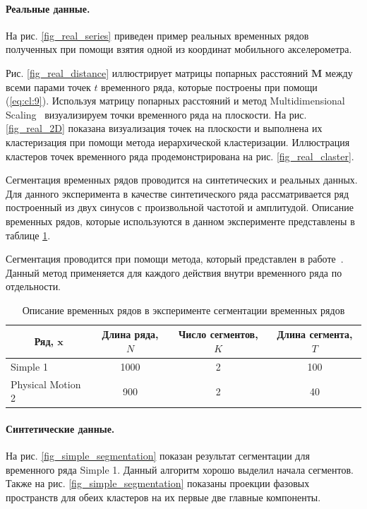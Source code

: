 \paragraph{Реальные данные.}

На рис. \ref{fig_real_series} приведен пример реальных временных рядов полученных при помощи взятия одной из координат мобильного акселерометра. 

Рис. \ref{fig_real_distance} иллюстрирует матрицы попарных расстояний $\textbf{M}$ между всеми парами точек $t$ временного ряда, которые построены при помощи (\ref{eq:cl:9}). 
Используя матрицу попарных расстояний и метод Multidimensional Scaling~\cite{Borg2005} визуализируем точки временного ряда на плоскости. 
На рис. \ref{fig_real_2D} показана визуализация точек на плоскости и выполнена их кластеризация при помощи метода иерархической кластеризации. 
Иллюстрация кластеров точек временного ряда продемонстрирована на рис. \ref{fig_real_claster}.

Сегментация временных рядов проводится на синтетических и реальных данных. Для данного эксперимента в качестве синтетического ряда рассматривается ряд построенный из двух синусов с произвольной частотой и амплитудой. Описание временных рядов, которые используются в данном эксперименте представлены в таблице \ref{table:3}.

Сегментация проводится при помощи метода, который представлен в работе~\cite{motrenko2015}. Данный метод применяется для каждого действия внутри временного ряда по отдельности.


\begin{table}[h!t]
\begin{center}
\caption{Описание временных рядов в эксперименте сегментации временных рядов}
\label{table:3}
\begin{tabular}{|c|c|c|c|}
\hline
	Ряд, $\textbf{x}$ &Длина ряда, $N$& Число сегментов, $K$&Длина сегмента, $T$\\
	\hline
	\multicolumn{1}{|l|}{Simple 1}
	& 1000& 2& 100\\
	\hline
	\multicolumn{1}{|l|}{Physical Motion 2}
	& 900& 2& 40\\
\hline

\end{tabular}
\end{center}
\end{table}

\paragraph{Синтетические данные.} На рис. \ref{fig_simple_segmentation} показан результат сегментации для временного ряда Simple 1. 
Данный алгоритм хорошо выделил начала сегментов. 
Также на рис. \ref{fig_simple_segmentation} показаны проекции фазовых пространств для обеих кластеров на их первые две главные компоненты.

